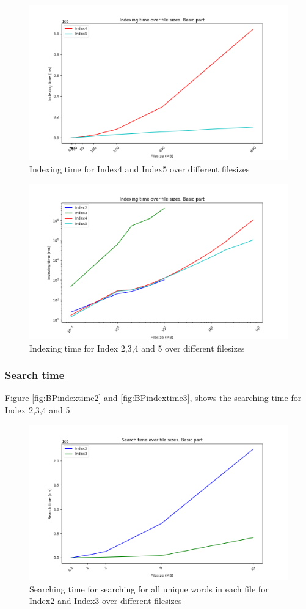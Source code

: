 \begin{figure}[H]
    \centering
    \includegraphics[width=.8\textwidth]{LaTeX/Pictures/Results/BPIndexing[4, 5].png}
    \caption{Indexing time for Index4 and Index5 over different filesizes}
    \label{fig:BPindextime45}
\end{figure}

\begin{figure}[H]
    \centering
    \includegraphics[width=.8\textwidth]{LaTeX/Pictures/Results/BPIndexing[2, 3, 4, 5].png}
    \caption{Indexing time for Index 2,3,4 and 5 over different filesizes}
    \label{fig:BPindextime2345}
\end{figure}

\subsubsection{Search time}
Figure \ref{fig:BPindextime2} and \ref{fig:BPindextime3}, shows the searching time for Index 2,3,4 and 5.

\begin{figure}[H]
    \centering
    \includegraphics[width=.8\textwidth]{LaTeX/Pictures/Results/BPSearch[2, 3].png}
    \caption{Searching time for searching for all unique words in each file for Index2 and Index3 over different filesizes}
    \label{fig:BPsearch23}
\end{figure}

